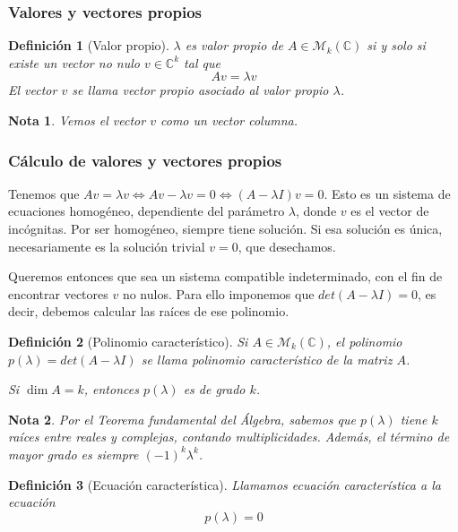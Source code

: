 \documentclass[11pt, a4paper]{article}
\newif\IfInSansMode
\numberwithin{equation}{section}
\theoremstyle{theorem-style}
\theoremstyle{definition-style}
\newtheorem{ndef}{Definición}[section]
\theoremstyle{remark-style}
\newtheorem*{nota}{Nota}
\theoremstyle{example-style}
\begin{document}
\subsubsection{Valores y vectores propios}

\begin{ndef}[Valor propio]
  $\lambda$ es \textit{valor propio} de $A \in \mathcal M_k (\mathbb C)$ si y solo si
  existe un vector no nulo $v \in \mathbb C^k$ tal que $$Av = \lambda v$$
  El vector $v$ se llama \textit{vector propio asociado al valor propio} $\lambda$.
\end{ndef}

\begin{nota}
  Vemos el vector $v$ como un vector columna.
\end{nota}

\subsubsection{Cálculo de valores y vectores propios}

  Tenemos que $Av = \lambda v \iff Av - \lambda v = 0 \iff (A -
  \lambda I)v = 0$. Esto es un sistema de ecuaciones homogéneo, dependiente del parámetro $\lambda$, donde $v$ es el vector de incógnitas. Por ser homogéneo, siempre tiene solución. Si esa solución es única, necesariamente es la solución trivial $v = 0$, que desechamos.

  Queremos entonces que sea un sistema compatible indeterminado, con el fin de encontrar vectores $v$ no nulos. Para ello imponemos que
  $det(A - \lambda I) = 0$, es decir, debemos calcular las raíces de ese polinomio.
  
  \begin{ndef}[Polinomio característico] Si $A \in \mathcal M_k(\mathbb C)$, el polinomio $p(\lambda)= det (A-\lambda I)$ se llama \textit{polinomio característico} de la matriz $A$.
  
  Si $\dim A = k$, entonces $p(\lambda)$ es de grado $k$.
	
\end{ndef}
\begin{nota}
	Por el \textit{Teorema fundamental del Álgebra}, sabemos que $p(\lambda)$ tiene $k$ raíces entre reales y complejas, contando multiplicidades. Además, el término de mayor grado es siempre $(-1)^k\lambda^k$.
\end{nota}

\begin{ndef}[Ecuación característica] Llamamos \textit{ecuación característica} a la ecuación $$p(\lambda) = 0$$
	
\end{ndef}
\end{document}
